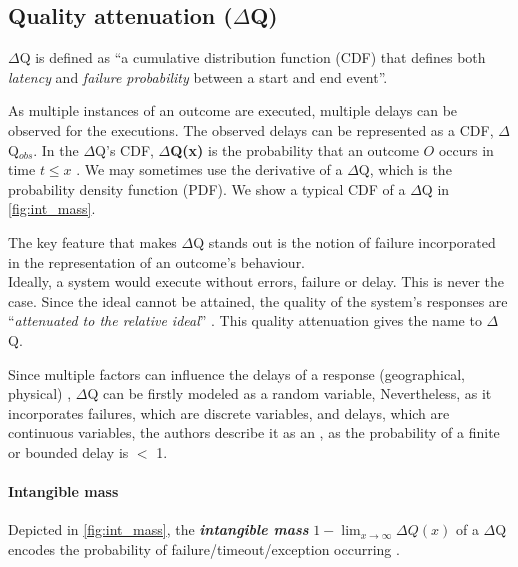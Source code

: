 \subsection{Quality attenuation ($\Delta$Q)}
    $\Delta$Q is defined as ``a cumulative distribution function (CDF) that defines both \textit{latency} and \textit{failure probability} between a start and end event''. \cite{dq-tut}
    
        As multiple instances of an outcome are executed, multiple delays can be observed for the executions. The observed delays can be represented as a CDF, $\Delta$Q$_{obs}$. In the $\Delta$Q's CDF, \textbf{$\Delta$Q(x)} is the probability that an outcome $O$ occurs in time $t \le x$ \cite{art}.  We may sometimes use the derivative of a $\Delta$Q, which is the probability density function (PDF). We show a typical CDF of a $\Delta$Q in \cref{fig:int_mass}.

    The key feature that makes $\Delta$Q stands out is the notion of failure incorporated in the representation of an outcome's behaviour. \\
 Ideally, a system would execute without errors, failure or delay. This is never the case. Since the ideal cannot be attained, the quality of the system's responses are ``\textit{attenuated to the relative ideal}''  \cite{myo}. This quality attenuation gives the name to $\Delta$Q.

    Since multiple factors can influence the delays of a response (geographical, physical) \cite{dq-tut}, $\Delta$Q can be firstly modeled as a random variable,  Nevertheless, as it incorporates failures, which are discrete variables, and delays, which are continuous variables, the authors describe it as an , as the probability of a finite or bounded delay is $<$ 1. \cite{myo}
   
    \paragraph{Intangible mass} Depicted in \cref{fig:int_mass}, the \textbf{\textit{intangible mass}} $1 - \lim_{x\to\infty}\Delta Q(x)$ of a $\Delta$Q encodes the probability of failure/timeout/exception occurring \cite{art}. \label{int_mass}
        
